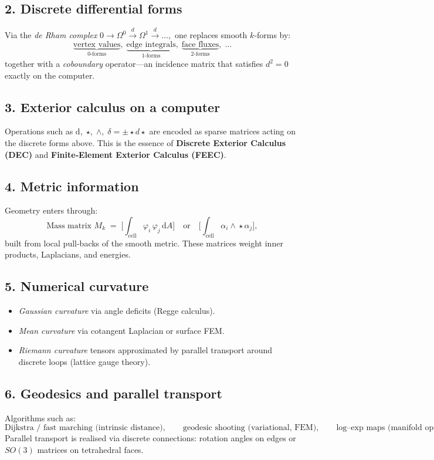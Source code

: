 \documentclass[12pt]{article}
\theoremstyle{definition} %
\theoremstyle{plain} %
\begin{document}
\subsection*{2.  Discrete differential forms}
Via the \emph{de Rham complex}
\(
	0 \!\to\! \Omega^0 \!\xrightarrow{d}\! \Omega^1 \!\xrightarrow{d}\! \dots,
\)
one replaces smooth $k$‑forms by:
\[
	\underbrace{\text{vertex values}}_{\text{0‑forms}},\;
	\underbrace{\text{edge integrals}}_{\text{1‑forms}},\;
	\underbrace{\text{face fluxes}}_{\text{2‑forms}},\;\dots
\]
together with a \emph{coboundary} operator—an incidence matrix that
satisfies $d^2=0$ exactly on the computer.

\subsection*{3.  Exterior calculus on a computer}
Operations such as 
\(
	\mathrm{d},\;\star,\;\wedge,\;\delta=\pm\!\star\!d\star
\)
are encoded as sparse matrices acting on the discrete forms above.
This is the essence of \textbf{Discrete Exterior Calculus (DEC)} and
\textbf{Finite‑Element Exterior Calculus (FEEC)}.

\subsection*{4.  Metric information}
Geometry enters through:
\[
	\text{Mass matrix }M_k
	\;=\;\bigl[\!\int_{\text{cell}} \varphi_i \,\varphi_j\,\mathrm{d}A
	\bigr]
	\quad\text{or}\quad
	\bigl[\!\int_{\text{cell}} \alpha_i \!\wedge\! \star\alpha_j\bigr],
\]
built from local pull‑backs of the smooth metric.
These matrices weight inner products, Laplacians, and energies.

\subsection*{5.  Numerical curvature}
\begin{itemize}
  \item \emph{Gaussian curvature} via angle deficits (Regge calculus).
  \item \emph{Mean curvature} via cotangent Laplacian or surface FEM.
  \item \emph{Riemann curvature} tensors approximated by parallel
        transport around discrete loops (lattice gauge theory).
\end{itemize}

\subsection*{6.  Geodesics and parallel transport}
Algorithms such as:
\[
	\text{Dijkstra / fast marching (intrinsic distance)}, \qquad
	\text{geodesic shooting (variational, FEM)}, \qquad
	\text{log–exp maps (manifold optimisation)}.
\]
Parallel transport is realised via discrete connections: rotation angles
on edges or $SO(3)$ matrices on tetrahedral faces.
\end{document}
